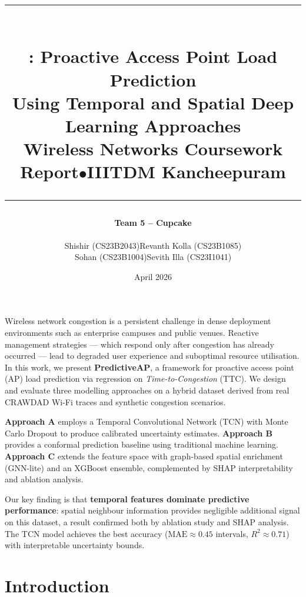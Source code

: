 \documentclass[12pt,a4paper]{article}
\title{
    \vspace{-1.2cm}
    {\color{apblue}\rule{\linewidth}{2pt}}\\[0.6em]
    \Large\textbf{\predap: Proactive Access Point Load Prediction}\\[0.35em]
    \large Using Temporal and Spatial Deep Learning Approaches\\[0.8em]
    \normalsize\textcolor{apdarkgrey}{Wireless Networks Coursework Report\enspace$\bullet$\enspace IIITDM Kancheepuram}\\[0.2em]
    {\color{apblue}\rule{\linewidth}{1pt}}
}
\author{
    \textbf{Team 5 – Cupcake}\\[0.5em]
    \begin{tabular}{cc}
        Shishir \textcolor{apdarkgrey}{\small(CS23B2043)} & Revanth Kolla \textcolor{apdarkgrey}{\small(CS23B1085)}\\[2pt]
        Sohan \textcolor{apdarkgrey}{\small(CS23B1004)}   & Sevith Illa \textcolor{apdarkgrey}{\small(CS23I1041)}
    \end{tabular}
}
\date{\textcolor{apdarkgrey}{April 2026}}
\newcommand{\ttc}{\textsc{TTC}}
\newcommand{\predap}{\textbf{PredictiveAP}}
\begin{document}
\maketitle
\thispagestyle{empty}
\vspace{0.3em}

\begin{tcolorbox}[
    enhanced,
    colback=apgrey,
    colframe=apblue,
    title=\textbf{Abstract},
    fonttitle=\color{white},
    coltitle=white,
    attach boxed title to top left={yshift=-2mm,xshift=6mm},
    boxed title style={colback=apblue},
    left=6pt, right=6pt, top=10pt, bottom=6pt,
    boxrule=1pt,
]
Wireless network congestion is a persistent challenge in dense deployment environments such as enterprise campuses and public venues. Reactive management strategies — which respond only after congestion has already occurred — lead to degraded user experience and suboptimal resource utilisation. In this work, we present \predap, a framework for proactive access point (AP) load prediction via regression on \emph{Time-to-Congestion} (\ttc). We design and evaluate three modelling approaches on a hybrid dataset derived from real CRAWDAD Wi-Fi traces and synthetic congestion scenarios.
\medskip

\textbf{Approach A} employs a Temporal Convolutional Network (TCN) with Monte Carlo Dropout to produce calibrated uncertainty estimates. \textbf{Approach B} provides a conformal prediction baseline using traditional machine learning. \textbf{Approach C} extends the feature space with graph-based spatial enrichment (GNN-lite) and an XGBoost ensemble, complemented by SHAP interpretability and ablation analysis.
\medskip

Our key finding is that \textbf{temporal features dominate predictive performance}: spatial neighbour information provides negligible additional signal on this dataset, a result confirmed both by ablation study and SHAP analysis. The TCN model achieves the best accuracy (\(\text{MAE} \approx 0.45\) intervals, \(R^2 \approx 0.71\)) with interpretable uncertainty bounds.
\end{tcolorbox}

\vspace{0.5em}
\tableofcontents
\newpage

\section{Introduction}
\label{sec:intro}
\end{document}
